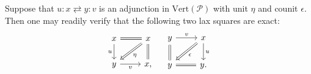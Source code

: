 \documentclass[a4paper, 11pt]{amsart}
\numberwithin{theorem}{section}
\theoremstyle{definition}
\renewcommand{\P}{\mathscr{P}}
\renewcommand{\Vert}{\mathrm{Vert}}
\begin{document}
\begin{example}
	Suppose that 
	$u : x \rightleftarrows y :v$
	is an adjunction in $\Vert(\P)$ with unit $\eta$ and counit $\epsilon$. Then one may readily verify that
	the following two lax squares are exact:
	\[
		\begin{tikzcd}
			x \arrow[r, equal ]\arrow[d,"u"'] &|[alias=f]| x \arrow[d, equal] \\ 
			|[alias=t]|y \arrow[r, "v"'] & x,
			\arrow[from=f,to=t, Rightarrow, "\eta"]
		\end{tikzcd}
		\quad 
		\begin{tikzcd}
			y \arrow[r, "v"]\arrow[d,equal] &|[alias=f]| x \arrow[d, "u"] \\ 
			|[alias=t]|y \arrow[r, equal] & y.
			\arrow[from=f,to=t, Rightarrow, "\epsilon"]
		\end{tikzcd}
	\]
\end{example}
\end{document}
